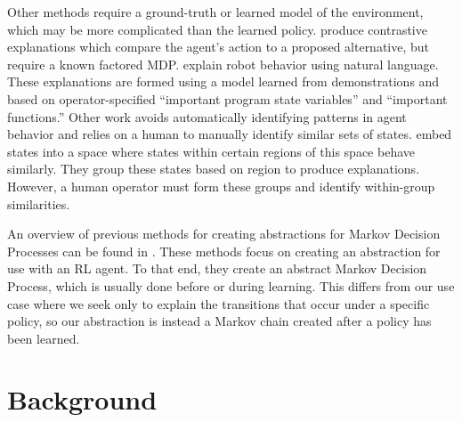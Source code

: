 \documentclass[letterpaper]{article} %
\begin{document}
Other methods require a ground-truth or learned model of the environment, which may be more complicated than the learned policy. \cite{MinSufExp} produce contrastive explanations which compare the agent's action to a proposed alternative, but require a known factored MDP. \cite{ImpRoboticController} explain robot behavior using natural language. These explanations are formed using a model learned from demonstrations and based on operator-specified ``important program state variables'' and ``important functions.'' 
Other work avoids automatically identifying patterns in agent behavior and relies on a human to manually identify similar sets of states. \cite{cluster_drl} embed states into a space where states within certain regions of this space behave similarly. They group these states based on region to produce explanations. However, a human operator must form these groups and identify within-group similarities. 

An overview of previous methods for creating abstractions for Markov Decision Processes can be found in \cite{UnifiedAbstraction}. These methods focus on creating an abstraction for use with an RL agent. To that end, they create an abstract Markov Decision Process, which is usually done before or during learning. 
This differs from our use case where we seek only to explain the transitions that occur under a specific policy, so our abstraction is instead a Markov chain created after a policy has been learned.

\section{Background}
\end{document}

